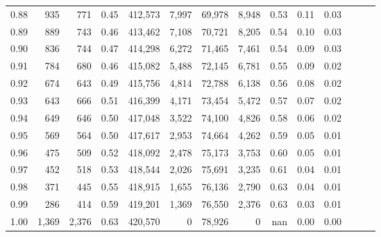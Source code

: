 \begin{tabular}{rrrrrrrrrrrrrr}
0.88 &     935 &    771 &  0.45 &  412,573 &    7,997 &  69,978 &   8,948 &  0.53 &  0.11 &      0.03 \\
0.89 &     889 &    743 &  0.46 &  413,462 &    7,108 &  70,721 &   8,205 &  0.54 &  0.10 &      0.03 \\
0.90 &     836 &    744 &  0.47 &  414,298 &    6,272 &  71,465 &   7,461 &  0.54 &  0.09 &      0.03 \\
0.91 &     784 &    680 &  0.46 &  415,082 &    5,488 &  72,145 &   6,781 &  0.55 &  0.09 &      0.02 \\
0.92 &     674 &    643 &  0.49 &  415,756 &    4,814 &  72,788 &   6,138 &  0.56 &  0.08 &      0.02 \\
0.93 &     643 &    666 &  0.51 &  416,399 &    4,171 &  73,454 &   5,472 &  0.57 &  0.07 &      0.02 \\
0.94 &     649 &    646 &  0.50 &  417,048 &    3,522 &  74,100 &   4,826 &  0.58 &  0.06 &      0.02 \\
0.95 &     569 &    564 &  0.50 &  417,617 &    2,953 &  74,664 &   4,262 &  0.59 &  0.05 &      0.01 \\
0.96 &     475 &    509 &  0.52 &  418,092 &    2,478 &  75,173 &   3,753 &  0.60 &  0.05 &      0.01 \\
0.97 &     452 &    518 &  0.53 &  418,544 &    2,026 &  75,691 &   3,235 &  0.61 &  0.04 &      0.01 \\
0.98 &     371 &    445 &  0.55 &  418,915 &    1,655 &  76,136 &   2,790 &  0.63 &  0.04 &      0.01 \\
0.99 &     286 &    414 &  0.59 &  419,201 &    1,369 &  76,550 &   2,376 &  0.63 &  0.03 &      0.01 \\
1.00 &   1,369 &  2,376 &  0.63 &  420,570 &        0 &  78,926 &       0 &   nan &  0.00 &      0.00 \\
\bottomrule
\end{tabular}
